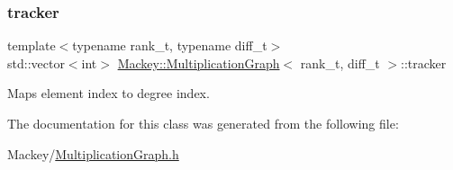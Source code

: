 \subsubsection{\texorpdfstring{tracker}{tracker}}
{\footnotesize\ttfamily template$<$typename rank\+\_\+t, typename diff\+\_\+t$>$ \\
std\+::vector$<$int$>$ \hyperlink{classMackey_1_1MultiplicationGraph}{Mackey\+::\+Multiplication\+Graph}$<$ rank\+\_\+t, diff\+\_\+t $>$\+::tracker\hspace{0.3cm}{\ttfamily [protected]}}



Maps element index to degree index. 



The documentation for this class was generated from the following file\+:\begin{DoxyCompactItemize}
\item 
Mackey/\hyperlink{MultiplicationGraph_8h}{Multiplication\+Graph.\+h}\end{DoxyCompactItemize}
